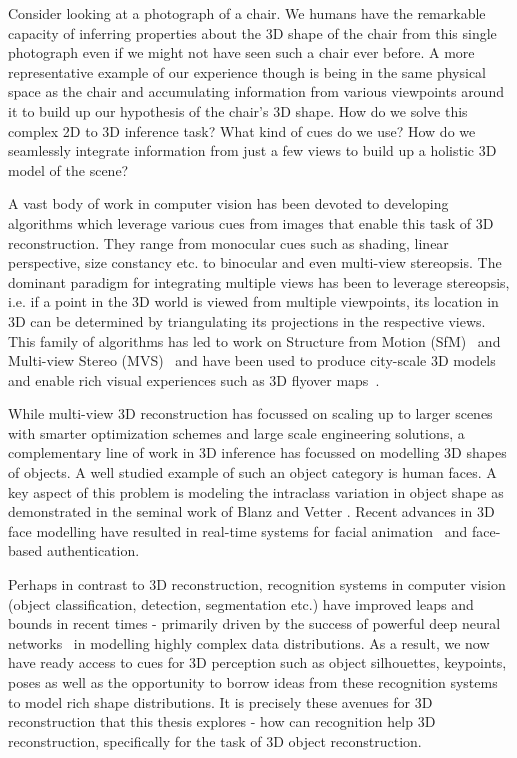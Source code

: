 \documentclass[../thesis.tex]{subfiles}
\begin{document}
Consider looking at a photograph of a chair. We humans have the remarkable capacity of inferring properties about the 3D shape of the chair from this single photograph even if we might not have seen such a chair ever before. A more representative example of our experience though is being in the same physical space as the chair and accumulating information from various viewpoints around it to build up our hypothesis of the chair’s 3D shape. How do we solve this complex 2D to 3D inference task? What kind of cues do we use?
How do we seamlessly integrate information from just a few views to build up a holistic 3D model of the scene?

A vast body of work in computer vision has been devoted to developing algorithms which leverage various cues from images that enable this task of 3D reconstruction. They range from monocular cues such as shading, linear perspective, size constancy etc. \cite{palmer1999vision} to binocular \cite{louis1960methods} and even multi-view stereopsis. The dominant paradigm for integrating multiple views has been to leverage stereopsis, i.e. if a point in the 3D world is viewed from multiple viewpoints, its location in 3D can be determined by triangulating its projections in the respective views. This family of algorithms has led to work on Structure from Motion (SfM)~\cite{17kruppa1913,longuet1981computer,TomasiKanade92} and Multi-view Stereo (MVS)~\cite{seitz2006comparison,furukawa2015multi} and have been used to produce city-scale 3D models~\cite{agarwal2011building} and enable rich visual experiences such as 3D flyover maps~\cite{kushal2012photo}.

While multi-view 3D reconstruction has focussed on scaling up to larger scenes with smarter optimization schemes and large scale engineering solutions, a complementary line of work in 3D inference has focussed on modelling 3D shapes of objects. A well studied example of such an object category is human faces. A key aspect of this problem is modeling the intraclass variation in object shape as demonstrated in the seminal work of Blanz and Vetter \cite{blanz1999morphable}. Recent advances \cite{kemelmacher2011internet,movingFace:eccv14} in 3D face modelling have resulted in real-time systems for facial animation~\cite{thies2016face} and face-based authentication. 

Perhaps in contrast to 3D reconstruction, recognition systems in computer vision (object classification, detection, segmentation etc.) have improved leaps and bounds in recent times - primarily driven by the success of powerful deep neural networks~\cite{Lecun89} in modelling highly complex data distributions. As a result, we now have ready access to cues for 3D perception such as object silhouettes, keypoints, poses as well as the opportunity to borrow ideas from these recognition systems to model rich shape distributions. It is precisely these avenues for 3D reconstruction that this thesis explores - how can recognition help 3D reconstruction, specifically for the task of 3D object reconstruction. 
\end{document}
